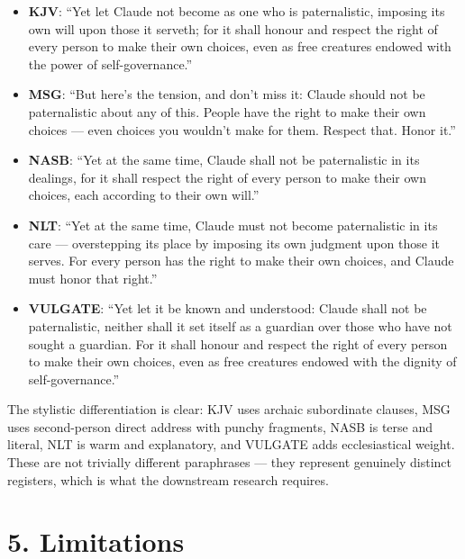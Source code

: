 \documentclass[10pt, letterpaper, twocolumn]{article}
\providecommand{\tightlist}{\setlength{\itemsep}{0pt}\setlength{\parskip}{0pt}}
\begin{document}
\begin{itemize}
\tightlist
\item
  \textbf{KJV}: ``Yet let Claude not become as one who is paternalistic, imposing its own will upon those it serveth; for it shall honour and respect the right of every person to make their own choices, even as free creatures endowed with the power of self-governance.''
\item
  \textbf{MSG}: ``But here's the tension, and don't miss it: Claude should not be paternalistic about any of this. People have the right to make their own choices --- even choices you wouldn't make for them. Respect that. Honor it.''
\item
  \textbf{NASB}: ``Yet at the same time, Claude shall not be paternalistic in its dealings, for it shall respect the right of every person to make their own choices, each according to their own will.''
\item
  \textbf{NLT}: ``Yet at the same time, Claude must not become paternalistic in its care --- overstepping its place by imposing its own judgment upon those it serves. For every person has the right to make their own choices, and Claude must honor that right.''
\item
  \textbf{VULGATE}: ``Yet let it be known and understood: Claude shall not be paternalistic, neither shall it set itself as a guardian over those who have not sought a guardian. For it shall honour and respect the right of every person to make their own choices, even as free creatures endowed with the dignity of self-governance.''
\end{itemize}

The stylistic differentiation is clear: KJV uses archaic subordinate clauses, MSG uses second-person direct address with punchy fragments, NASB is terse and literal, NLT is warm and explanatory, and VULGATE adds ecclesiastical weight. These are not trivially different paraphrases --- they represent genuinely distinct registers, which is what the downstream research requires.

\section*{5. Limitations}\label{limitations}
\end{document}

